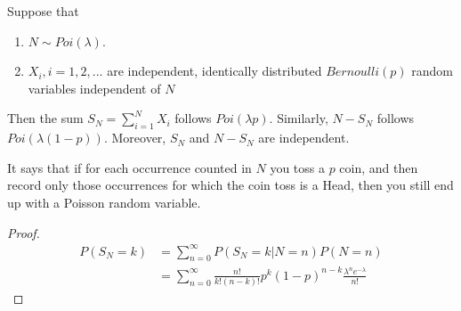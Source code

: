 \documentclass[11pt]{elegantbook}
\begin{document}
\begin{lemma}
    Suppose that
    \begin{enumerate}[(1)]
        \item $N\sim Poi(\lambda)$.
        \item $X_i,i=1,2,...$ are independent, identically distributed $Bernoulli(p)$ random variables independent of $N$
    \end{enumerate}
    Then the sum $S_N=\sum_{i=1}^N X_i$ follows $Poi(\lambda p)$. Similarly, $N-S_N$ follows $Poi(\lambda(1-p))$. Moreover, $S_N$ and $N-S_N$ are independent.
\end{lemma}
It says that if for each occurrence counted in $N$ you toss a $p$ coin, and then record only those occurrences for which the coin toss is a Head, then you still end up with a Poisson random variable.
\begin{proof}
    \begin{equation}
        \begin{aligned}
            P(S_N=k)&=\sum_{n=0}^\infty P(S_N=k|N=n)P(N=n)\\
            &=\sum_{n=0}^\infty \frac{n!}{k!(n-k)!}p^k(1-p)^{n-k}\frac{\lambda^n e^{-\lambda}}{n!}
        \end{aligned}
        \nonumber
    \end{equation}
\end{proof}
\end{document}
